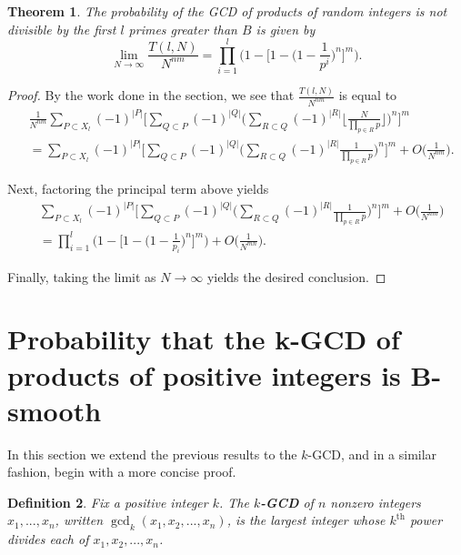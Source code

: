 \documentclass[12pt]{amsart}
\newtheorem{theorem}{Theorem}[subsection]
\newtheorem{definition}[theorem]{Definition}
\theoremstyle{definition}
\begin{document}
\begin{theorem} The probability of the GCD of products of random integers is not divisible by the first $l$ primes greater than $B$ is given by 
	$$\lim_{N\to\infty} \frac{T(l,N)}{N^{nm}} = \prod_{i=1}^{l} \Big(1 - \Big[1 - \Big(1-\frac{1}{p^i}\Big)^n\Big]^m\Big).$$
\end{theorem}

\begin{proof}
	By the work done in the section, we see that $\displaystyle \frac{T(l,N)}{N^{nm}}$ is equal to 
	\begin{align*}
		&\frac{1}{N^{nm}}\sum_{P\subset X_l}{(-1)^{|P|}}\Big[\sum_{Q\subset P}(-1)^{|Q|}\Big(\sum_{R\subset Q}(-1)^{|R|}\Big\lfloor\frac{N}{\prod_{p\in R} p} \Big\rfloor\Big)^n\Big]^m\\
		&= \sum_{P\subset X_l}{(-1)^{|P|}} \Big[\sum_{Q\subset P}(-1)^{|Q|} \Big(\sum_{R\subset Q}(-1)^{|R|} \frac{1}{\prod_{p\in R} p}\Big)^n\Big]^m+O\Big(\frac{1}{N^{nm}}\Big).
	\end{align*}
	
	\noindent Next, factoring the principal term above yields
	\begin{align*}
		&\sum_{P\subset X_l}{(-1)^{|P|}} \Big[\sum_{Q\subset P}(-1)^{|Q|} \Big(\sum_{R\subset Q}(-1)^{|R|}\frac{1}{\prod_{p\in R} p}\Big)^n \Big]^m + O\Big(\frac{1}{N^{nm}}\Big)\\ &= \prod_{i=1}^{l} \Big(1 - \Big[1 - \Big(1 - \frac{1}{p_i}\Big)^n\Big]^m \Big) + O\Big(\frac{1}{N^{mn}}\Big). 
	\end{align*}
	
	\noindent Finally, taking the limit as $N \to \infty$ yields the desired conclusion.
\end{proof}

\section{Probability that the k-GCD of products of positive integers is  B-smooth}
In this section we extend the previous results to the $k$-GCD, and in a similar fashion, begin with a more concise proof.

\begin{definition} Fix a positive integer $k$. The \textbf{$k$-GCD} of $n$ nonzero integers $x_1, ..., x_n$, written $\gcd_k(x_1,x_2, ...,x_n)$, is the largest integer whose $k^{\text{th}}$ power divides each of $x_1, x_2, ..., x_n$.
\end{definition}	
\end{document}
